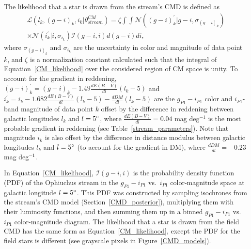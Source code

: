 \documentclass[iop]{emulateapj}
\begin{document}
The likelihood that a star is drawn from the stream's CMD is defined as
\begin{equation}
\begin{split}
\mathcal{L}(l_k, (g-i)_k, i_k| \theta^{CM}_{stream})=\zeta \int\int \mathcal{N}((g-i)^\prime_k| g-i, \sigma_{(g-i)_k}) \\
\times \mathcal{N}(i^\prime_k | i, \sigma_{i_k})\mathcal{I}(g-i, i)d(g-i)di,\label{CM_likelihood}
\end{split}
\end{equation}
where
$\sigma_{(g-i)_k}$ and $\sigma_{i_k}$ are the uncertainty in color and magnitude
of data point $k$, and $\zeta$ is a normalization constant calculated such that
the integral of Equation~\ref{CM_likelihood} over the considered region of CM
space is unity. To account for the gradient in reddening,
$(g-i)^\prime_k=(g-i)_k - 1.49\frac{dE(B-V)}{dl}(l_k-5)$ and
$i^\prime_k=i_k - 1.682\frac{dE(B-V)}{dl}(l_k-5) - \frac{dDM}{dl}(l_k-5)$ are
the $g_{P1}-i_{P1}$ color and $i_{P1}$-band magnitude of data point $k$ offset
by the difference in reddening between galactic longitudes $l_k$ and
$l=5\mbox{$^\circ$}$, where $\frac{dE(B-V)}{dl}=0.04$ mag deg$^{-1}$ is the most
probable gradient in reddening (see Table~\ref{stream_parameters}). Note that
magnitude $i_k$ is also offset by the difference in distance modulus between
galactic longitudes $l_k$ and $l=5\mbox{$^\circ$}$ (to account for the gradient in DM), 
where $\frac{dDM}{dl}=-0.23$ mag deg$^{-1}$.

In Equation~\ref{CM_likelihood}, $\mathcal{I}(g-i, i)$ is the probability
density function (PDF) of the Ophiuchus stream in the $g_{P1}-i_{P1}$
vs.~$i_{P1}$ color-magnitude space at galactic longitude $l=5\mbox{$^\circ$}$. This PDF
was constructed by sampling isochrones from the stream's CMD model
(Section~\ref{CMD_posterior}), multiplying them with their luminosity functions,
and then summing them up in a binned $g_{P1}-i_{P1}$ vs.~$i_{P1}$
color-magnitude diagram. The likelihood that a star is drawn from the field CMD
has the same form as Equation~\ref{CM_likelihood}, except the PDF for the field
stars is different (see grayscale pixels in Figure~\ref{CMD_models}).
\end{document}
